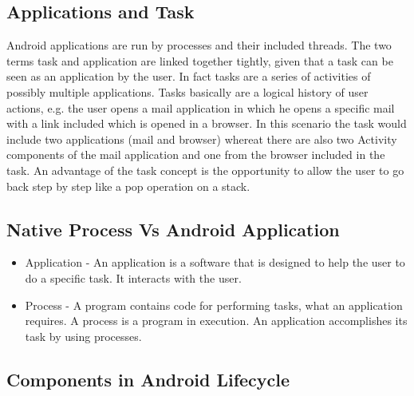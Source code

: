 \documentclass[12pt]{report}
\begin{document}
\subsection{Applications and Task}
Android applications are run by processes and their included threads.  The two
terms task and application are linked together tightly, given that a task can be seen
as an application by the user.  In fact tasks are a series of activities of possibly
multiple applications.  Tasks basically are a logical history of user actions, e.g.
the user opens a mail application in which he opens a specific mail with a link
included which is opened in a browser. In this scenario the task would include two
applications (mail and browser) whereat there are also two
Activity
components of
the mail application and one from the browser included in the task. An advantage
of the task concept is the opportunity to allow the user to go back step by step like
a pop operation on a stack.
\subsection{Native Process Vs Android Application}
\begin{itemize}
	\item Application - An application is a software that is designed to help the user to do a specific task. It interacts with the user.
	\item Process - A program contains code for performing tasks, what an application requires. A process is a program in execution. An application accomplishes its task by using processes.  
\end{itemize}

\subsection{Components in Android Lifecycle}
\end{document}
